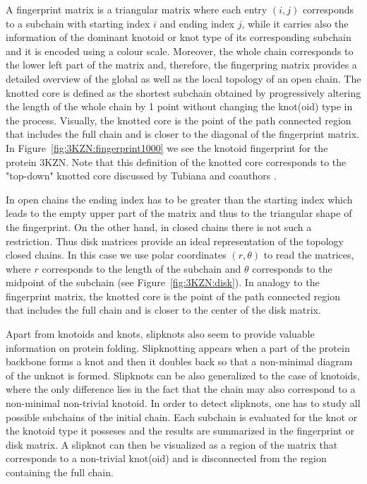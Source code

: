 A fingerprint matrix is a triangular matrix where  each entry $(i,j)$ corresponds to a subchain with starting index $i$ and ending index $j$, while it carries also the information of the dominant knotoid or knot type  of its corresponding subchain and it is encoded using a colour scale. Moreover, the whole chain corresponds to the lower left part of the matrix and, therefore, the fingerpring matrix provides a detailed overview of the global as well as the local topology of an open chain.
The knotted core is defined as the shortest subchain obtained by progressively altering the length of the whole chain by 1 point without changing the knot(oid) type in the process. Visually, the knotted core is the  point of the path connected region that includes  the full chain and is closer to the diagonal of the fingerprint matrix. In Figure~\ref{fig:3KZN:fingerprint1000} we see the knotoid fingerprint for the protein 3KZN. Note that this definition of the knotted core corresponds to the "top-down" knotted core discussed by Tubiana and coauthors \cite{tubiana2011}.



In open chains the ending index has to be greater than the starting index which leads to the empty upper part of the matrix and thus to the triangular shape of the fingerprint. On the other hand, in closed chains there is not such a restriction\cite{rawdon,rawdon2}. Thus disk matrices provide an ideal representation of the topology closed chains. In this case we use polar coordinates $(r, \theta)$ to read the matrices, where $r$ corresponds to the length of the subchain and $\theta$ corresponds to the midpoint of the subchain (see Figure~\ref{fig:3KZN:disk}). In analogy to the fingerprint matrix, the knotted core is the  point of the path connected region that includes  the full chain and is closer to the center of the disk matrix.

Apart from knotoids and knots, slipknots also seem to provide valuable information on protein folding\cite{yeates}. Slipknotting appears when a part of the protein backbone forms a knot and then it doubles back so that a non-minimal diagram of the unknot is formed\cite{yeates}. Slipknots can be also generalized to the case of knotoids, where the only difference lies in the fact that the chain may also correspond to a non-minimal non-trivial knotoid. In order to detect slipknots, one has to study all possible subchains of the initial chain. Each subchain is evaluated for the knot or the knotoid type it posseses and the results are summarized in the fingerprint\cite{yeates, sulkowska2012,gound} or disk matrix\cite{rawdon}.
A slipknot can then be visualized as a  region of the matrix that corresponds to a non-trivial knot(oid) and  is disconnected from the region containing the full chain.



\clearpage

